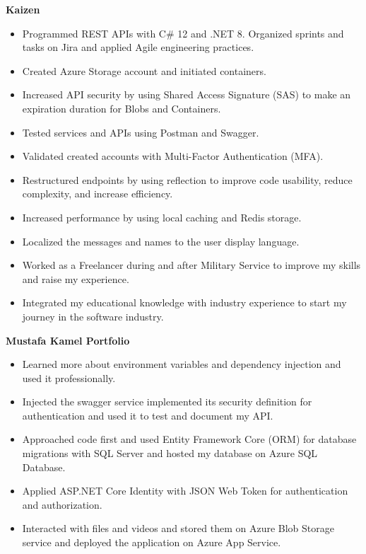 





{\bfseries Kaizen}
\begin{itemize}
    \item Programmed REST APIs with C\# 12 and .NET 8. Organized sprints and tasks on Jira and applied Agile engineering practices.
    \item Created Azure Storage account and initiated containers.
    \item Increased API security by using Shared Access Signature (SAS) to make an expiration duration for Blobs and Containers.
    \item Tested services and APIs using Postman and Swagger.
    \item Validated created accounts with Multi-Factor Authentication (MFA).
    \item Restructured endpoints by using reflection to improve code usability, reduce complexity, and increase efficiency.
    \item Increased performance by using local caching and Redis storage.
    \item Localized the messages and names to the user display language.
\end{itemize}

\divider

\begin{itemize}
    \item Worked as a Freelancer during and after Military Service to improve my skills and raise my experience.
    \item Integrated my educational knowledge with industry experience to start my journey in the software industry.
\end{itemize}

{\bfseries Mustafa Kamel Portfolio}\hspace{0.5cm}{\small Sep. 2022 -- Oct. 2022}
\begin{itemize}
    \item Learned more about environment variables and dependency injection and used it professionally.
    \item Injected the swagger service implemented its security definition for authentication and used it to test and document my API.
    \item Approached code first and used Entity Framework Core (ORM) for database migrations with SQL Server and hosted my database on Azure SQL Database.
    \item Applied ASP.NET Core Identity with JSON Web Token for authentication and authorization.
    \item Interacted with files and videos and stored them on Azure Blob Storage service and deployed the application on Azure App Service.
\end{itemize}
